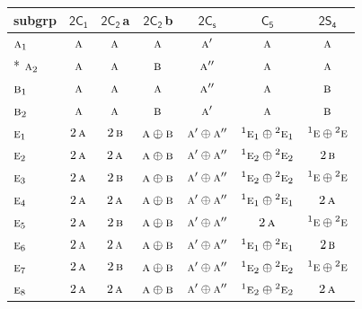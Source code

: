 \documentclass[10pt,a4paper]{article}
\numberwithin{equation}{section}
\newcommand{\grp}[1]{\mathsf{#1}}
\newcommand{\irr}[1]{\text{\normalfont\scshape #1}}
\newcommand{\conjpair}[1]{{}^{#1}}
\newcommand{\clsletter}[1]{\,{\scriptsize\color{black!55}#1}}
\begin{document}
{\small\begin{longtable}{@{}lcccccc@{}}\toprule
subgrp & \href{2C1.pdf}{$\grp{2C_{1}}$} & \href{2C2.pdf}{$\grp{2C_{2}}$}\clsletter{a} & \href{2C2.pdf}{$\grp{2C_{2}}$}\clsletter{b} & \href{2C1v.pdf}{$\grp{2C_{s}}$} & \href{C5.pdf}{$\grp{C_{5}}$} & \href{2S4.pdf}{$\grp{2S_{4}}$}\\\midrule\endhead
\bottomrule\endfoot\endlastfoot
$\irr{a}_{1}$ & $\irr{a}$ & $\irr{a}$ & $\irr{a}$ & $\irr{a}'$ & $\irr{a}$ & $\irr{a}$\\*
$\irr{a}_{2}$ & $\irr{a}$ & $\irr{a}$ & $\irr{b}$ & $\irr{a}''$ & $\irr{a}$ & $\irr{a}$\\
$\irr{b}_{1}$ & $\irr{a}$ & $\irr{a}$ & $\irr{a}$ & $\irr{a}''$ & $\irr{a}$ & $\irr{b}$\\
$\irr{b}_{2}$ & $\irr{a}$ & $\irr{a}$ & $\irr{b}$ & $\irr{a}'$ & $\irr{a}$ & $\irr{b}$\\
$\irr{e}_{1}$ & $2\,\irr{a}$ & $2\,\irr{b}$ & $\irr{a}\oplus \irr{b}$ & $\irr{a}'\oplus \irr{a}''$ & $\conjpair{1}\irr{e}_{1}\oplus \conjpair{2}\irr{e}_{1}$ & $\conjpair{1}\irr{e}\oplus \conjpair{2}\irr{e}$\\
$\irr{e}_{2}$ & $2\,\irr{a}$ & $2\,\irr{a}$ & $\irr{a}\oplus \irr{b}$ & $\irr{a}'\oplus \irr{a}''$ & $\conjpair{1}\irr{e}_{2}\oplus \conjpair{2}\irr{e}_{2}$ & $2\,\irr{b}$\\
$\irr{e}_{3}$ & $2\,\irr{a}$ & $2\,\irr{b}$ & $\irr{a}\oplus \irr{b}$ & $\irr{a}'\oplus \irr{a}''$ & $\conjpair{1}\irr{e}_{2}\oplus \conjpair{2}\irr{e}_{2}$ & $\conjpair{1}\irr{e}\oplus \conjpair{2}\irr{e}$\\
$\irr{e}_{4}$ & $2\,\irr{a}$ & $2\,\irr{a}$ & $\irr{a}\oplus \irr{b}$ & $\irr{a}'\oplus \irr{a}''$ & $\conjpair{1}\irr{e}_{1}\oplus \conjpair{2}\irr{e}_{1}$ & $2\,\irr{a}$\\
$\irr{e}_{5}$ & $2\,\irr{a}$ & $2\,\irr{b}$ & $\irr{a}\oplus \irr{b}$ & $\irr{a}'\oplus \irr{a}''$ & $2\,\irr{a}$ & $\conjpair{1}\irr{e}\oplus \conjpair{2}\irr{e}$\\
$\irr{e}_{6}$ & $2\,\irr{a}$ & $2\,\irr{a}$ & $\irr{a}\oplus \irr{b}$ & $\irr{a}'\oplus \irr{a}''$ & $\conjpair{1}\irr{e}_{1}\oplus \conjpair{2}\irr{e}_{1}$ & $2\,\irr{b}$\\
$\irr{e}_{7}$ & $2\,\irr{a}$ & $2\,\irr{b}$ & $\irr{a}\oplus \irr{b}$ & $\irr{a}'\oplus \irr{a}''$ & $\conjpair{1}\irr{e}_{2}\oplus \conjpair{2}\irr{e}_{2}$ & $\conjpair{1}\irr{e}\oplus \conjpair{2}\irr{e}$\\
$\irr{e}_{8}$ & $2\,\irr{a}$ & $2\,\irr{a}$ & $\irr{a}\oplus \irr{b}$ & $\irr{a}'\oplus \irr{a}''$ & $\conjpair{1}\irr{e}_{2}\oplus \conjpair{2}\irr{e}_{2}$ & $2\,\irr{a}$\\

\end{longtable}}
\end{document}

